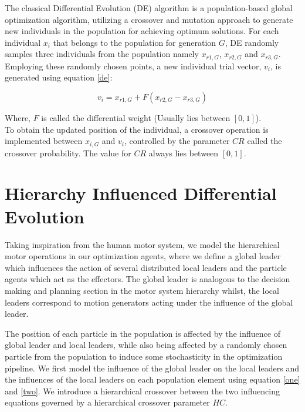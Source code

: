 \documentclass[a4paper,twoside]{article}
\begin{document}
The classical Differential Evolution (DE) algorithm is a population-based global optimization algorithm, utilizing a crossover and mutation approach to generate new individuals in the population for achieving optimum solutions\cite{das2011differential}. For each individual $x_i$ that belongs to the population for generation $G$, DE randomly samples three individuals from the population namely $x_{r1,G}$, $x_{r2,G}$ and $x_{r3,G}$. Employing these randomly chosen points, a new individual trial vector, $v_i$, is generated using equation \eqref{de}:

\begin{equation}
\label{de}
v_i = x_{r1,G} + F (x_{r2,G} - x_{r3,G})
\end{equation}

Where, $F$ is called the differential weight (Usually lies between $[0, 1]$).\\
To obtain the updated position of the individual, a crossover operation is implemented between $x_{i,G}$ and $v_i$, controlled by the parameter $CR$ called the crossover probability. The value for $CR$ always lies between $[0, 1]$.


\section{Hierarchy Influenced Differential Evolution}

Taking inspiration from the human motor system, we model the hierarchical motor operations in our optimization agents, where we define a global leader which influences the action of several distributed local leaders and the particle agents which act as the effectors. The global leader is analogous to the decision making and planning section in the motor system hierarchy whilst, the local leaders correspond to motion generators acting under the influence of the  global leader.


The position of each particle in the population is affected by the influence of global leader and local leaders, while also being affected by a randomly chosen particle from the population to induce some stochasticity in the optimization pipeline. We first model the influence of the global leader on the local leaders and the influences of the local leaders  on each population element using equation \eqref{one} and \eqref{two}. We introduce a hierarchical crossover between the two influencing equations governed by a hierarchical crossover parameter $HC$.
\end{document}
